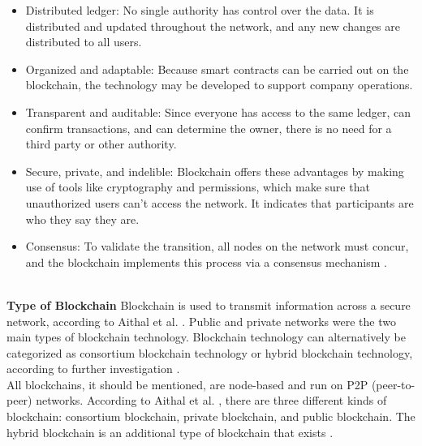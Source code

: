 \begin{itemize}
    \item Distributed ledger: No single authority has control over the data. It is distributed and updated throughout the network, and any new changes are distributed to all users.
    \item Organized and adaptable: Because smart contracts can be carried out on the blockchain, the technology may be developed to support company operations.
   \item Transparent and auditable: Since everyone has access to the same ledger, can confirm transactions, and can determine the owner, there is no need for a third party or other authority. 
    \item Secure, private, and indelible:
    Blockchain offers these advantages by making use of tools like cryptography and permissions, which make sure that unauthorized users can't access the network. It indicates that participants are who they say they are.
    \item Consensus: To validate the transition, all nodes on the network must concur, and the blockchain implements this process via a consensus mechanism \cite{Gupta}.
\end{itemize}
\\
\textbf{Type of Blockchain}
Blockchain is used to transmit information across a secure network, according to Aithal et al. \cite{Aithal}. Public and private networks were the two main types of blockchain technology. Blockchain technology can alternatively be categorized as consortium blockchain technology or hybrid blockchain technology, according to further investigation \cite{Aithal}. \\
All blockchains, it should be mentioned, are node-based and run on P2P (peer-to-peer) networks. According to Aithal et al. \cite{Aithal}, there are three different kinds of blockchain: consortium blockchain, private blockchain, and public blockchain. The hybrid blockchain is an additional type of blockchain that exists \cite{Aithal}.
